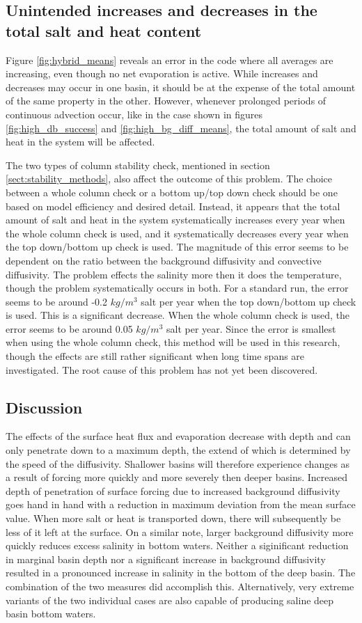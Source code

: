 \documentclass[twocolumn]{article}
\begin{document}
\subsection{Unintended increases and decreases in the total salt and heat content}
\label{sect:totals_problem}
Figure \ref{fig:hybrid_means} reveals an error in the code where all averages are increasing, even though no net evaporation is active. While increases and decreases may occur in one basin, it should be at the expense of the total amount of the same property in the other. However, whenever prolonged periods of continuous advection occur, like in the case shown in figures \ref{fig:high_db_success} and \ref{fig:high_bg_diff_means}, the total amount of salt and heat in the system will be affected.

The two types of column stability check, mentioned in section \ref{sect:stability_methods}, also affect the outcome of this problem. The choice between a whole column check or a bottom up/top down check should be one based on model efficiency and desired detail. Instead, it appears that the total amount of salt and heat in the system systematically increases every year when the whole column check is used, and it systematically decreases every year when the top down/bottom up check is used. The magnitude of this error seems to be dependent on the ratio between the background diffusivity and convective diffusivity. The problem effects the salinity more then it does the temperature, though the problem systematically occurs in both. 
For a standard run, the error seems to be around -0.2 $kg/m^3$ salt per year when the top down/bottom up check is used. This is a significant decrease. When the whole column check is used, the error seems to be around 0.05 $kg/m^3$ salt per year. Since the error is smallest when using the whole column check, this method will be used in this research, though the effects are still rather significant when long time spans are investigated. The root cause of this problem has not yet been discovered. 

\subsection{Discussion}
The effects of the surface heat flux and evaporation decrease with depth and can only penetrate down to a maximum depth, the extend of which is determined by the speed of the diffusivity. Shallower basins will therefore experience changes as a result of forcing more quickly and more severely then deeper basins. Increased depth of penetration of surface forcing due to increased background diffusivity goes hand in hand with a reduction in maximum deviation from the mean surface value. When more salt or heat is transported down, there will subsequently be less of it left at the surface. On a similar note, larger background diffusivity more quickly reduces excess salinity in bottom waters.
Neither a siginificant reduction in marginal basin depth nor a significant increase in background diffusivity resulted in a pronounced increase in salinity in the bottom of the deep basin. The combination of the two measures did accomplish this. Alternatively, very extreme variants of the two individual cases are also capable of producing saline deep basin bottom waters.
\end{document}
